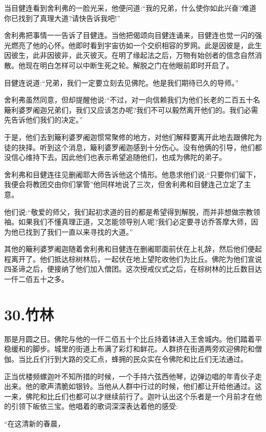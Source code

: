 \documentclass[12pt,twoside,openany]{book}
\begin{document}
当目健连看到舍利弗的一脸光采，他便问道:“我的兄弟，什么使你如此兴奋?难道你已找到了真理大道?请快告诉我吧!”

舍利弗把事情一一告诉了目健连。当他把偈颂向目健连诵来，目健连也觉一闪的强光燃亮了他的心怀。他即时看到宇宙彷如一个交织相容的罗网。此是因彼是，此生因彼生，此非因彼非，此灭彼灭。在明了缘起法之后，万物有始创者的信念自然消散。他现在明白怎样可以中断生死之轮。解脱之门在他眼前即时开启了。

目健连说道:“兄弟，我们一定要立刻去见佛陀。他是我们期待已久的导师。”

舍利弗虽然同意，但却提醒他说:“不过，对一向信赖我们为他们长老的二百五十名簸利婆罗阇迦兄弟们，我们又应该怎办呢?我们不可以毅然离开他们的。我们必需先告诉他们我们的决定。”

于是，他们去到簸利婆罗阇迦惯常聚修的地方，对他们解释要离开此地去跟佛陀为徒的抉择。听到这个消息，簸利婆罗阇迦感到十分伤心。没有他俩的引导，他们都没信心维持下去。因此他们也表示希望追随他们，也成为佛陀的弟子。

舍利弗和目健连往见删阇耶大师告诉他这个情形。他恳求他们说:“只要你们留下，我便会将教团交由你们掌管”他同样地说了三次，但舍利弗和目健连己立定了主意。

他们说:“敬爱的师父，我们起初求道的目的都是希望得到解脱，而并非想做宗教领袖。如果我们不懂真理正道，又怎能领导别人呢?我们必定要寻访乔答摩大师，因为他已找到了我们一直以来寻找的大道。”

其他的簸利婆罗阇迦随着舍利弗和目健连在删阇耶面前伏在上礼辞，然后他们便起程离开了。他们抵达棕树林后，一起伏在地上望陀收他们为比丘。佛陀为他们宣说四圣谛之后，便接纳了他们加入僧团。这次授戒仪式之后，在棕树林的比丘数目达一仟二佰五十之多。


\chapter{30.竹林}\label{ch30}

那是月圆之日。佛陀与他的一仟二佰五十个比丘持着钵进入王舍城内。他们踏着平稳缓和的脚步。城里的街道上布满了彩灯和鲜花。人群挤在街道两旁欢迎佛陀和僧伽。当比丘们行到大路的交汇点，蜂拥的民众实在令佛陀和比丘们无法通过。

正当优楼频螺迦叶不知所措的时候，一个手持六弦西他琴，边弹边唱的年青伙子走出来。他的歌声清脆如银铃。当他从人群中行过的时候，他们都让开给他通过。这一来，佛陀和比丘们也都可以才继续前行了。迦叶认出这个乐者是一个月前才在他的引领下皈依三宝。他唱着的歌词深深表达着他的感受:

“在这清新的春晨，
\end{document}
